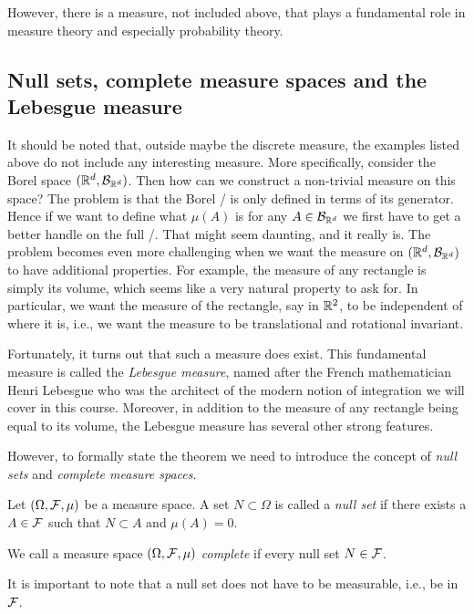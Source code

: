 However, there is a measure, not included above, that plays a fundamental role in measure theory and especially probability theory.

\subsection{Null sets, complete measure spaces and the Lebesgue measure}

It should be noted that, outside maybe the discrete measure, the examples listed above do not include any interesting measure. More specifically, consider the Borel space $(\mathbb R^d, \mathcal B_{\mathbb R^d})$. Then how can we construct a non-trivial measure on this space? The problem is that the Borel \sigalg/ is only defined in terms of its generator. Hence if we want to define what $\mu(A)$ is for any $A \in \mathcal B_{\mathbb R^d}$ we first have to get a better handle on the full \sigalg/. That might seem daunting, and it really is. The problem becomes even more challenging when we want the measure on $(\mathbb R^d, \mathcal B_{\mathbb R^d})$ to have additional properties. For example, the measure of any rectangle is simply its volume, which seems like a very natural property to ask for. In particular, we want the measure of the rectangle, say in $\mathbb R^2$, to be independent of where it is, i.e., we want the measure to be translational and rotational invariant.

Fortunately, it turns out that such a measure does exist. This fundamental measure is called the \emph{Lebesgue measure}, named after the French mathematician Henri Lebesgue who was the architect of the modern notion of integration we will cover in this course. Moreover, in addition to the measure of any rectangle being equal to its volume, the Lebesgue measure has several other strong features. 

However, to formally state the theorem we need to introduce the concept of \emph{null sets} and \emph{complete measure spaces}.

\begin{definition}
Let $(\Omega, \mathcal F, \mu)$ be a measure space. A set $N \subset \Omega$ is called a \emph{null set} if there exists a $A \in \mathcal F$ such that $N \subset A$ and $\mu(A) = 0$.

We call a measure space $(\Omega, \mathcal F, \mu)$ \emph{complete} if every null set $N \in \mathcal F$. 
\end{definition}

It is important to note that a null set does not have to be measurable, i.e., be in $\mathcal F$. 

